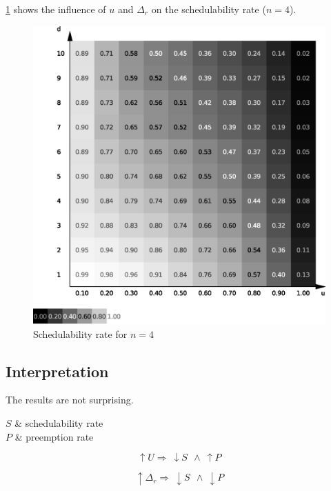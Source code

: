 \documentclass[a4paper,12pt]{article}
\begin{document}
\ref{fig:stu:4s} shows the influence of $u$ and $\Delta_r$ on the schedulability rate ($n = 4$).

\begin{figure}
	\centering
	\includegraphics[width=1\textwidth]{../mean/eps/4s}
	\caption{\label{fig:stu:4s} Schedulability rate for $n = 4$}
\end{figure}

\subsection{Interpretation}

The results are not surprising.

\begin{conditions}
	$S$ & schedulability rate\\
	$P$ & preemption rate
\end{conditions}

\begin{equation}
	\uparrow U \Rightarrow ~\downarrow S ~~\land ~\uparrow P
	\label{eq:U influence}
\end{equation}

\begin{equation}
	\uparrow \Delta_r \Rightarrow ~\downarrow S ~~\land ~\downarrow P
	\label{eq:d influence}
\end{equation}
\end{document}
